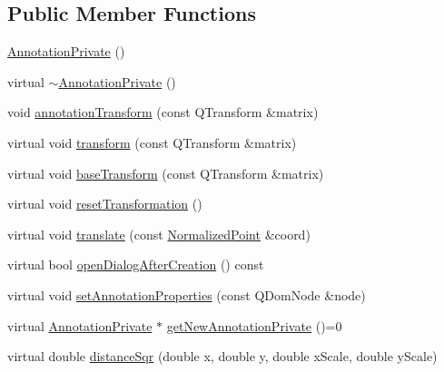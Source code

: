 \subsection*{Public Member Functions}
\begin{DoxyCompactItemize}
\item 
\hyperlink{classOkular_1_1AnnotationPrivate_affc5d14076f4606905c3c0cd2f6b9dc1}{Annotation\+Private} ()
\item 
virtual \hyperlink{classOkular_1_1AnnotationPrivate_a9ea42bcbf0ff30348f462f9da55ffb9b}{$\sim$\+Annotation\+Private} ()
\item 
void \hyperlink{classOkular_1_1AnnotationPrivate_a1add0ae079273c89e70abae1c85c3333}{annotation\+Transform} (const Q\+Transform \&matrix)
\item 
virtual void \hyperlink{classOkular_1_1AnnotationPrivate_a0d340a5ed89975edc173b72569f1e3f0}{transform} (const Q\+Transform \&matrix)
\item 
virtual void \hyperlink{classOkular_1_1AnnotationPrivate_aa60e3513cd1a25f60afbdef5614683d2}{base\+Transform} (const Q\+Transform \&matrix)
\item 
virtual void \hyperlink{classOkular_1_1AnnotationPrivate_afb8f0d99eefa51347efaef5114511154}{reset\+Transformation} ()
\item 
virtual void \hyperlink{classOkular_1_1AnnotationPrivate_aee9684802697da01c33c4dec9de56ee1}{translate} (const \hyperlink{classOkular_1_1NormalizedPoint}{Normalized\+Point} \&coord)
\item 
virtual bool \hyperlink{classOkular_1_1AnnotationPrivate_aeb7f48383177812c27abf1230416a520}{open\+Dialog\+After\+Creation} () const 
\item 
virtual void \hyperlink{classOkular_1_1AnnotationPrivate_a5fc7b450fa8c7e2717372e7394c3aa39}{set\+Annotation\+Properties} (const Q\+Dom\+Node \&node)
\item 
virtual \hyperlink{classOkular_1_1AnnotationPrivate}{Annotation\+Private} $\ast$ \hyperlink{classOkular_1_1AnnotationPrivate_a4a27afb6108cff892c7bcccd8ba3aafa}{get\+New\+Annotation\+Private} ()=0
\item 
virtual double \hyperlink{classOkular_1_1AnnotationPrivate_ab4288200b0dd46f33e4958a64ffac373}{distance\+Sqr} (double x, double y, double x\+Scale, double y\+Scale)
\end{DoxyCompactItemize}
